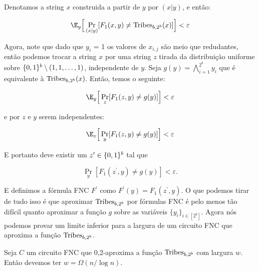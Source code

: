 Denotamos a string $x$ construida a partir de $y$ por $(x \lvert y)$, e então:

\begin{equation*}
	\E_{y}\Big[\Pr_{(x \lvert y)}[F_{1}(x, y) \neq \Tribes_{b, 2^{b}}(x)]\Big] < \varepsilon
\end{equation*}

Agora, note que dado que $y_{i}$ = 1 os valores de $x_{i, j}$ são meio que redudantes, então podemos trocar a string $x$ por uma string $z$ tirada da distribuição uniforme sobre $\{0, 1\}^{b} \setminus (1, 1, \dots, 1)$, independente de $y$. Seja $g(y) = \bigwedge_{i = 1}^{2^{b}}y_{i}$ que é equivalente à $\text{Tribes}_{b, 2^{b}}(x)$. Então, temos o seguinte:

\begin{equation*}
	\E_{y}\Big[ \Pr_{z}[F_{1}(z, y) \neq g(y)]\Big] < \varepsilon
\end{equation*}

e por $z$ e $y$ serem independentes:

\begin{equation*}
	\E_{z}\Big[\Pr_{y}[F_{1}(z, y) \neq g(y)]\Big] < \varepsilon
\end{equation*}

E portanto deve existir um $z^{\prime} \in \{0, 1\}^{b}$ tal que

\begin{equation*}
	\Pr_{y}[F_{1}(z^{\prime}, y) \neq g(y)] < \varepsilon.
\end{equation*}

E definimos a fórmula FNC $F^{\prime}$ como $F^{\prime}(y) = F_{1}(z^{\prime}, y)$. O que podemos tirar de tudo isso é que aproximar $\text{Tribes}_{b, 2^{b}}$ por fórmulas FNC é pelo menos tão difícil quanto aproximar a função $g$ sobre as variáveis $\{y_{i}\}_{i \in [2^{b}]}$. Agora nós podemos provar um limite inferior para a largura de um circuito FNC que aproxima a função $\text{Tribes}_{b, 2^{b}}$.

\begin{teo} \label{tribes_width_lb}

Seja $C$ um circuito FNC que 0,2-aproxima a função $\text{Tribes}_{b, 2^{b}}$ com largura $w$. Então devemos ter $w = \Omega(n/\log n)$.

\end{teo}